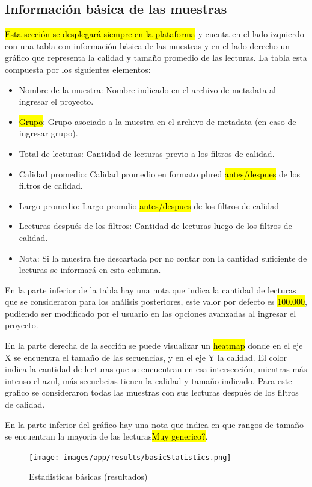 \subsection{Información básica de las muestras}
\hl{Esta sección se desplegará siempre en la plataforma} y cuenta en el lado izquierdo con una tabla con información básica de las muestras y en el lado derecho un gráfico que representa la calidad y tamaño promedio de las lecturas.
La tabla esta compuesta por los siguientes elementos:
\begin{itemize}
    \item Nombre de la muestra: Nombre indicado en el archivo de metadata al ingresar el proyecto.
    \item \hl{Grupo}: Grupo asociado a la muestra en el archivo de metadata (en caso de ingresar grupo).
    \item Total de lecturas: Cantidad de lecturas previo a los filtros de calidad.
    \item Calidad promedio: Calidad promedio en formato phred \hl{antes/despues} de los filtros de calidad.
    \item Largo promedio: Largo promdio \hl{antes/despues} de los filtros de calidad
    \item Lecturas después de los filtros: Cantidad de lecturas luego de los filtros de calidad.
    \item Nota: Si la muestra fue descartada por no contar con la cantidad suficiente de lecturas se informará en esta columna.
\end{itemize}
En la parte inferior de la tabla hay una nota que indica la cantidad de lecturas que se consideraron para los análisis posteriores, este valor por defecto es \hl{100.000}, pudiendo ser modificado por el usuario en las opciones avanzadas al ingresar el proyecto.

En la parte derecha de la sección se puede visualizar un \hl{heatmap} donde en el eje X se encuentra el tamaño de las secuencias, y en el eje Y la calidad. 
El color indica la cantidad de lecturas que se encuentran en esa intersección, mientras más intenso el azul, más secuebcias tienen la calidad y tamaño indicado.
Para este grafico se consideraron todas las muestras con sus lecturas después de los filtros de calidad.

En la parte inferior del gráfico hay una nota que indica en que rangos de tamaño se encuentran la mayoria de las lecturas\hl{Muy generico?}. 
\begin{figure}[H]
    \texttt{[image: images/app/results/basicStatistics.png]}

    \caption{Estadisticas básicas (resultados)}
    \label{fig:app-results-basicStatistics}
\end{figure}

